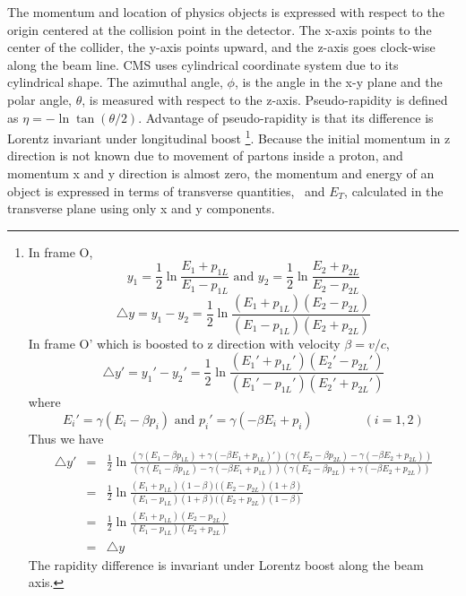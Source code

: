The momentum and location of physics objects is expressed with respect to the origin 
centered at the collision point in the detector. The x-axis points to the center 
of the collider, the y-axis points upward, and the z-axis goes clock-wise along the 
beam line. CMS uses cylindrical coordinate system due to its cylindrical shape. 
The azimuthal angle, $\phi$, is the angle in the x-y plane 
and the polar angle, $\theta$, is measured with respect to the z-axis. 
Pseudo-rapidity is defined as $\eta = - \ln \tan(\theta/2)$. 
Advantage of pseudo-rapidity is that its difference is Lorentz invariant 
under longitudinal boost \footnote[1]{  
In frame O, 
\begin{equation} 
y_1 = \frac{1}{2} \ln \frac{E_1+p_{1L}}{E_1-p_{1L}} \textrm{ and } 
y_2 = \frac{1}{2} \ln \frac{E_2+p_{2L}}{E_2-p_{2L}}  
\end{equation} 
\begin{equation} 
\triangle y = y_1 - y_2 = \frac{1}{2} 
  \ln \frac{(E_1+p_{1L})(E_2-p_{2L})}{(E_1-p_{1L})(E_2+p_{2L})} 
\end{equation} 
In frame O' which is boosted to z direction with velocity $\beta = v / c$, 
\begin{equation} 
\triangle y' = y_1' - y_2' =  \frac{1}{2} 
  \ln \frac{(E_1'+p_{1L}')(E_2'-p_{2L}')}{(E_1'-p_{1L}')(E_2'+p_{2L}')} 
\end{equation}
where 
\begin{equation} 
E_i' = \gamma(E_i - \beta p_i) \textrm{ and } p_i' = \gamma(-\beta E_i + p_i)
\quad \quad \quad \quad (i = 1, 2)
\end{equation} 
Thus we have 
\begin{eqnarray} 
\triangle y' 
 &=& 
 \frac{1}{2} 
  \ln \frac{( \gamma(E_1 - \beta p_{1L})+\gamma(-\beta E_1 + p_{1L})')
            ( \gamma(E_2 - \beta p_{2L})-\gamma(-\beta E_2 + p_{2L}))}
           {( \gamma(E_1 - \beta p_{1L})-\gamma(-\beta E_1 + p_{1L}))
            ( \gamma(E_2 - \beta p_{2L})+\gamma(-\beta E_2 + p_{2L}))}  \\
 &=& 
 \frac{1}{2} 
  \ln \frac{ (E_1+p_{1L})(1-\beta)((E_2-p_{2L})(1+\beta) }
           { (E_1-p_{1L})(1+\beta)((E_2+p_{2L})(1-\beta) } \\ 
 &=& 
 \frac{1}{2} 
  \ln \frac{ (E_1+p_{1L})(E_2-p_{2L}) }
           { (E_1-p_{1L})(E_2+p_{2L}) } \\ 
 &=& \triangle y
\end{eqnarray} 
The rapidity difference is invariant under Lorentz boost along the beam axis. 
}.
Because the initial momentum in z direction is not known due to movement of 
partons inside a proton, and momentum x and y direction is almost zero, 
the momentum and energy of an object is expressed in terms of 
transverse quantities, \pt\ and $E_T$, calculated in the transverse plane using 
only x and y components.

